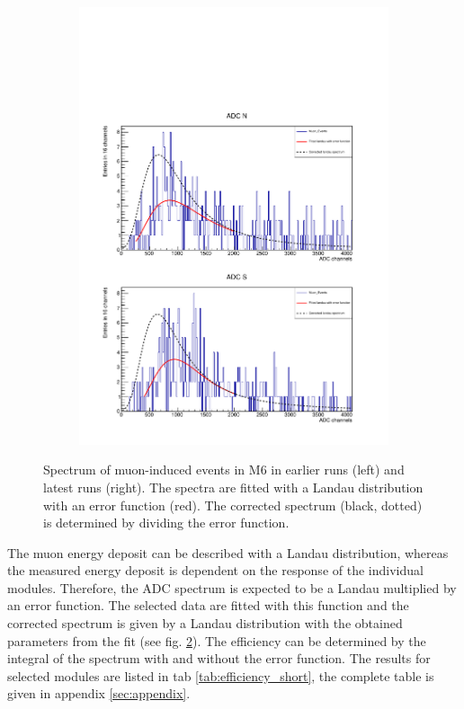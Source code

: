 \begin{figure}[h!]
\begin{subfigure}{0.5\linewidth}
    \includegraphics[width=\linewidth{}]{./fig/124M6CorrectedLandau.pdf}
    \caption{}
    \label{fig:landau_lateM6}
  \end{subfigure}
  \caption{Spectrum of muon-induced events in M6 in earlier runs (left) and latest runs (right). The spectra are fitted with a Landau distribution with an error function (red). The corrected spectrum (black, dotted) is determined by dividing the error function.}
  \label{fig:detection_M6}
\end{figure}

The muon energy deposit can be described with a Landau distribution, whereas the measured energy deposit is dependent on the response of the individual modules. Therefore, the ADC spectrum is expected to be a Landau multiplied by an error function. The selected data are fitted with this function and the corrected spectrum is given by a Landau distribution with the obtained parameters from the fit (see fig. \ref{fig:detection_M6}). The efficiency can be determined by the integral of the spectrum with and without the error function. The results for selected modules are listed in tab \ref{tab:efficiency_short}, the complete table is given in appendix \ref{sec:appendix}.


